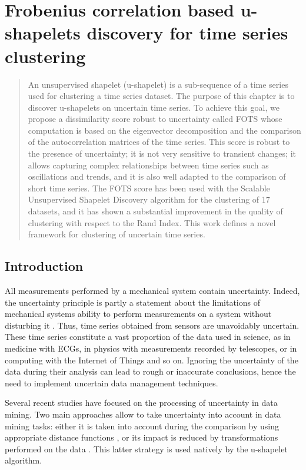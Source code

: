 \chapter[Uncertain time series u-shapelet discovery]{Frobenius correlation based u-shapelets discovery for time series clustering}
\label{fots}

\begin{abstract}
An unsupervised shapelet (u-shapelet) is a sub-sequence of a time series used for clustering a time series dataset. The purpose of this chapter  is to discover u-shapelets on uncertain time series. To achieve this goal, we propose a dissimilarity score robust to uncertainty called FOTS whose computation is based on the eigenvector decomposition and the comparison of the autocorrelation matrices of the time series. This score is robust to the presence of uncertainty; it is not very sensitive to transient changes; it allows capturing complex relationships between time series such as oscillations and trends, and it is also well adapted to the comparison of short time series. The FOTS score has been  used with the Scalable Unsupervised Shapelet Discovery algorithm for the clustering of 17 datasets, and it has shown a substantial improvement in the quality of  clustering with respect to the Rand Index. This work defines a novel framework for  clustering of uncertain time series.
\end{abstract}




\section{Introduction}
All measurements performed by a mechanical system contain uncertainty. Indeed, the uncertainty principle is partly a statement about the limitations of mechanical systems ability to perform measurements on a system without disturbing it \cite{folland1997uncertainty}. Thus, time series obtained from sensors are unavoidably uncertain. These time series  constitute a vast proportion of the data used in science, as in medicine with ECGs, in physics with measurements recorded by telescopes, or in computing with the Internet of Things and so on. Ignoring the uncertainty of the data
during their analysis can lead to rough or inaccurate conclusions, hence the need to implement uncertain data management techniques. 



Several recent studies have focused on the processing of uncertainty in data mining. Two main approaches allow to take uncertainty into account in data mining tasks: either it is taken into account during the comparison by using appropriate distance functions \cite{Rizvandi2013, Hwang2014, Rehfeld2014, Orang2014, Wang2015, Orang2017}, or its impact is reduced by transformations performed on the data
\cite{Orang2015}. This latter strategy is used natively by the u-shapelet algorithm.


